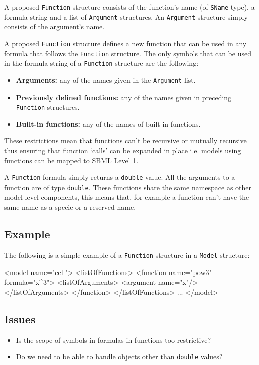 \documentclass{cekarticle}
\begin{document}
A proposed \texttt{Function} structure consists of the function's name (of
\texttt{SName} type), a formula string and a list of
\texttt{Argument} structures. An \texttt{Argument} structure
simply consists of the argument's name.

A proposed \texttt{Function} structure defines a new function that can be
used in any formula that follows the \texttt{Function} structure.
The only symbols that can be used in the formula string of a
\texttt{Function} structure are the following:
\begin{itemize}
\item \textbf{Arguments:} any of the names given in the \texttt{Argument} list.
\item \textbf{Previously defined functions:} any of the names given in preceding \texttt{Function} structures.
\item \textbf{Built-in functions:} any of the names of built-in functions.
\end{itemize}
These restrictions mean that functions can't be recursive or
mutually recursive thus ensuring that function `calls' can be
expanded in place i.e. models using functions can be mapped to
SBML Level 1.

A \texttt{Function} formula simply returns a \texttt{double}
value.  All the arguments to a function are of type
\texttt{double}.  These functions share the same namespace as
other model-level components, this means that, for example a
function can't have the same name as a specie or a reserved name.

\subsection{Example}

The following is a simple example of a \texttt{Function}
structure in a \texttt{Model} structure:

\begin{example}
<model name="cell">
    <listOfFunctions>
        <function name="pow3" formula="x^3">
            <listOfArguments>
                <argument name="x"/>
            </listOfArguments>
        </function>
    </listOfFunctions>
    ...
</model>
\end{example}

\subsection{Issues}
\begin{itemize}
\item Is the scope of symbols in formulas in functions too restrictive?
\item Do we need to be able to handle objects other than \texttt{double} values?
\end{itemize}
\end{document}
